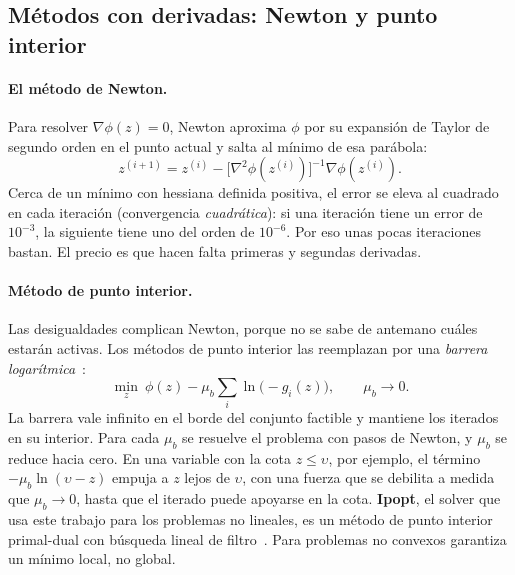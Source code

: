 \subsection{Métodos con derivadas: Newton y punto interior}
\paragraph{El método de Newton.} Para resolver $\nabla\phi(z)=0$, Newton aproxima $\phi$ por su
expansión de Taylor de segundo orden en el punto actual y salta al mínimo de esa parábola:
\[
z^{(i+1)}=z^{(i)}-\big[\nabla^2\phi(z^{(i)})\big]^{-1}\nabla\phi(z^{(i)}).
\]
Cerca de un mínimo con hessiana definida positiva, el error se eleva al cuadrado en cada
iteración (convergencia \emph{cuadrática}): si una iteración tiene un error de $10^{-3}$, la
siguiente tiene uno del orden de $10^{-6}$. Por eso unas pocas iteraciones bastan. El precio es
que hacen falta primeras y segundas derivadas.

\paragraph{Método de punto interior.} Las desigualdades complican Newton, porque no se sabe de
antemano cuáles estarán activas. Los métodos de punto interior las reemplazan por una
\emph{barrera logarítmica}~\cite{nocedal2006}:
\[
\min_z\ \phi(z)-\mu_b\sum_i\ln\big(-g_i(z)\big),\qquad \mu_b\to0 .
\]
La barrera vale infinito en el borde del conjunto factible y mantiene los iterados en su
interior. Para cada $\mu_b$ se resuelve el problema con pasos de Newton, y $\mu_b$ se reduce
hacia cero. En una variable con la cota $z\le\upsilon$, por ejemplo, el término
$-\mu_b\ln(\upsilon-z)$ empuja a $z$ lejos de $\upsilon$, con una fuerza que se debilita a
medida que $\mu_b\to0$, hasta que el iterado puede apoyarse en la cota. \textbf{Ipopt}, el solver
que usa este trabajo para los problemas no lineales, es un método de punto interior primal-dual
con búsqueda lineal de filtro~\cite{wachter2006}. Para problemas no convexos garantiza un
mínimo local, no global.

